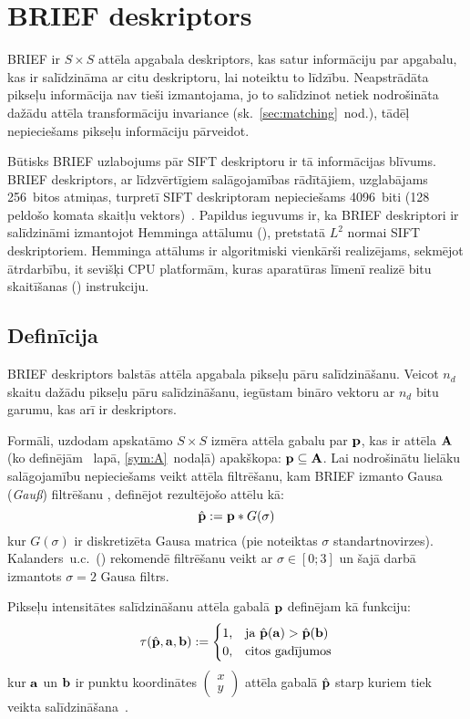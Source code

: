\section{BRIEF deskriptors} \label{sec:brief}
BRIEF ir $S \times S$ attēla apgabala deskriptors, kas satur informāciju par
apgabalu, kas ir salīdzināma ar citu deskriptoru, lai noteiktu to līdzību.
Neapstrādāta pikseļu informācija nav tieši izmantojama, jo to salīdzinot
netiek nodrošināta dažādu attēla transformāciju invariance
(sk.~\ref{sec:matching}~nod.), tādēļ nepieciešams pikseļu informāciju
pārveidot.

Būtisks BRIEF uzlabojums pār SIFT deskriptoru ir tā informācijas blīvums.
BRIEF deskriptors, ar līdzvērtīgiem salāgojamības rādītājiem, uzglabājams
256~bitos atmiņas, turpretī SIFT deskriptoram nepieciešams 4096~biti
(128 peldošo komata skaitļu vektors)~\cite{BRIEF}. Papildus ieguvums ir,
ka BRIEF deskriptori ir salīdzināmi izmantojot Hemminga attālumu
(), pretstatā $L^2$ normai SIFT deskriptoriem.
Hemminga attālums ir algoritmiski vienkārši realizējams, sekmējot ātrdarbību,
it sevišķi CPU platformām, kuras aparatūras līmenī realizē
bitu skaitīšanas () instrukciju.

\subsection{Definīcija} \label{sec:brief-def}
BRIEF deskriptors balstās attēla apgabala pikseļu pāru salīdzināšanu.
Veicot $n_d$ skaitu dažādu pikseļu pāru salīdzināšanu, iegūstam
bināro vektoru ar $n_d$ bitu garumu, kas arī ir deskriptors.
\cite{BRIEF}\cite{ORB}

Formāli, uzdodam apskatāmo $S \times S$ izmēra attēla gabalu par
$\mathbf{p}$, kas ir attēla $\mathbf{A}$
(ko definējām \pageref{sym:A}~lapā, \ref{sym:A}~nodaļā) apakškopa:
$\mathbf{p} \subseteq \mathbf{A}$. Lai nodrošinātu lielāku salāgojamību nepieciešams
veikt attēla filtrēšanu, kam BRIEF izmanto Gausa (\textit{Gauß}) filtrēšanu
\cite{BRIEF}, definējot rezultējošo attēlu kā:
\[
	\hat{\mathbf{p}} := \mathbf{p} \ast G(\sigma)
\]
kur $G(\sigma)$ ir diskretizēta Gausa matrica
(pie noteiktas $\sigma$ standartnovirzes).
Kalanders~u.c.\cite{BRIEF}~()
rekomendē filtrēšanu veikt ar $\sigma \in [0; 3]$ un šajā darbā izmantots
$\sigma = 2$ Gausa filtrs.

Pikseļu intensitātes salīdzināšanu attēla gabalā $\mathbf{p}$ definējam kā funkciju:
\begin{equation}
	\tau (\hat{\mathbf{p}}, \mathbf{a}, \mathbf{b}) := 
		\begin{cases}
			1\text{,} & \text{ja } \hat{\mathbf{p}}(\mathbf{a}) > \hat{\mathbf{p}}(\mathbf{b}) \\
			0\text{,} & \text{citos gadījumos}
		\end{cases}
\end{equation}
kur $\mathbf{a}$ un $\mathbf{b}$ ir punktu koordinātes
$\left(\begin{smallmatrix}x\\y\end{smallmatrix}\right)$
attēla gabalā $\hat{\mathbf{p}}$ starp kuriem tiek
veikta salīdzināšana~\cite{BRIEF}. 

